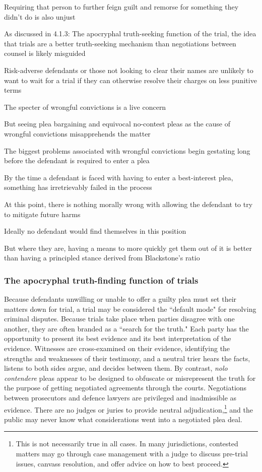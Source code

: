 Requiring that person to further feign guilt and remorse for something they didn't do is also unjust

As discussed in 4.1.3: The apocryphal truth-seeking function of the trial, the idea that trials are a better truth-seeking mechanism than negotiations between counsel is likely misguided

Risk-adverse defendants or those not looking to clear their names are unlikely to want to wait for a trial if they can otherwise resolve their charges on less punitive terms

The specter of wrongful convictions is a live concern

But seeing plea bargaining and equivocal no-contest pleas as the cause of wrongful convictions misapprehends the matter

The biggest problems associated with wrongful convictions begin gestating long before the defendant is required to enter a plea

By the time a defendant is faced with having to enter a best-interest plea, something has irretrievably failed in the process

At this point, there is nothing morally wrong with allowing the defendant to try to mitigate future harms

Ideally no defendant would find themselves in this position

But where they are, having a means to more quickly get them out of it is better than having a principled stance derived from Blackstone's ratio

\subsubsection{The apocryphal truth-finding function of trials}

Because defendants unwilling or unable to offer a guilty plea must set their matters down for trial, a trial may be considered the ``default mode" for resolving criminal disputes. Because trials take place when parties disagree with one another, they are often branded as a ``search for the truth." Each party has the opportunity to present its best evidence and its best interpretation of the evidence. Witnesses are cross-examined on their evidence, identifying the strengths and weaknesses of their testimony, and a neutral trier hears the facts, listens to both sides argue, and decides between them. By contrast, \textit{nolo contendere} pleas appear to be designed to obfuscate or misrepresent the truth for the purpose of getting negotiated agreements through the courts. Negotiations between prosecutors and defence lawyers are privileged and inadmissible as evidence. There are no judges or juries to provide neutral adjudication,\footnote{This is not necessarily true in all cases. In many jurisdictions, contested matters may go through case management with a judge to discuss pre-trial issues, canvass resolution, and offer advice on how to best proceed.} and the public may never know what considerations went into a negotiated plea deal. 

